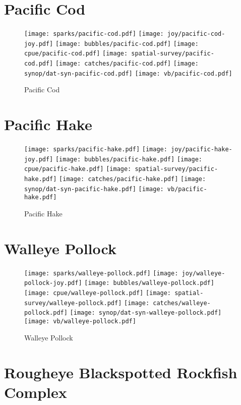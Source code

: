 \section{Pacific Cod}

\begin{figure}[htbp]
\centering
\texttt{[image: sparks/pacific-cod.pdf]}
\texttt{[image: joy/pacific-cod-joy.pdf]}
\texttt{[image: bubbles/pacific-cod.pdf]}
\texttt{[image: cpue/pacific-cod.pdf]}
\texttt{[image: spatial-survey/pacific-cod.pdf]}
\texttt{[image: catches/pacific-cod.pdf]}
\texttt{[image: synop/dat-syn-pacific-cod.pdf]}
\texttt{[image: vb/pacific-cod.pdf]}
\caption{Pacific Cod}
\end{figure}
\clearpage
\section{Pacific Hake}

\begin{figure}[htbp]
\centering
\texttt{[image: sparks/pacific-hake.pdf]}
\texttt{[image: joy/pacific-hake-joy.pdf]}
\texttt{[image: bubbles/pacific-hake.pdf]}
\texttt{[image: cpue/pacific-hake.pdf]}
\texttt{[image: spatial-survey/pacific-hake.pdf]}
\texttt{[image: catches/pacific-hake.pdf]}
\texttt{[image: synop/dat-syn-pacific-hake.pdf]}
\texttt{[image: vb/pacific-hake.pdf]}
\caption{Pacific Hake}
\end{figure}
\clearpage
\section{Walleye Pollock}

\begin{figure}[htbp]
\centering
\texttt{[image: sparks/walleye-pollock.pdf]}
\texttt{[image: joy/walleye-pollock-joy.pdf]}
\texttt{[image: bubbles/walleye-pollock.pdf]}
\texttt{[image: cpue/walleye-pollock.pdf]}
\texttt{[image: spatial-survey/walleye-pollock.pdf]}
\texttt{[image: catches/walleye-pollock.pdf]}
\texttt{[image: synop/dat-syn-walleye-pollock.pdf]}
\texttt{[image: vb/walleye-pollock.pdf]}
\caption{Walleye Pollock}
\end{figure}
\clearpage
\section{Rougheye Blackspotted Rockfish Complex}

